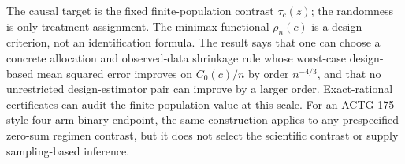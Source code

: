 The causal target is the fixed finite-population contrast \(\tau_c(z)\); the randomness is only treatment assignment. The minimax functional \(\rho_n(c)\) is a design criterion, not an identification formula. The result says that one can choose a concrete allocation and observed-data shrinkage rule whose worst-case design-based mean squared error improves on \(C_0(c)/n\) by order \(n^{-4/3}\), and that no unrestricted design-estimator pair can improve by a larger order. Exact-rational certificates can audit the finite-population value at this scale. For an ACTG 175-style four-arm binary endpoint, the same construction applies to any prespecified zero-sum regimen contrast, but it does not select the scientific contrast or supply sampling-based inference.